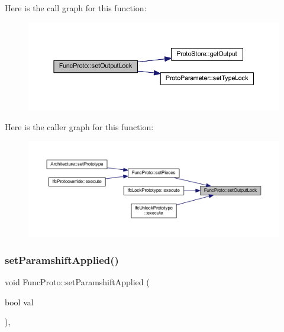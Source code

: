 Here is the call graph for this function\+:
\nopagebreak
\begin{figure}[H]
\begin{center}
\leavevmode
\includegraphics[width=350pt]{class_func_proto_a7593a0880a632bce714a376244ef4f9a_cgraph}
\end{center}
\end{figure}
Here is the caller graph for this function\+:
\nopagebreak
\begin{figure}[H]
\begin{center}
\leavevmode
\includegraphics[width=350pt]{class_func_proto_a7593a0880a632bce714a376244ef4f9a_icgraph}
\end{center}
\end{figure}
\mbox{\label{class_func_proto_ab1a494d8691b68a76a56495907ab9f6d}} 
\subsubsection{\texorpdfstring{setParamshiftApplied()}{setParamshiftApplied()}}
{\footnotesize\ttfamily void Func\+Proto\+::set\+Paramshift\+Applied (\begin{DoxyParamCaption}\item[{bool}]{val }\end{DoxyParamCaption})\hspace{0.3cm}{\ttfamily [inline]}, {\ttfamily [protected]}}



